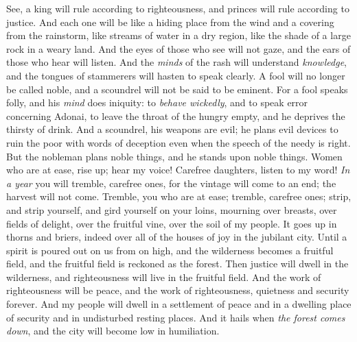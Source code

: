 \begin{biblechapter} %
 See, a king will rule according to righteousness, 
and princes will rule according to justice.
\verse And each one will be like a hiding place from the wind 
and a covering from the rainstorm, 
like streams of water in a dry region, 
like the shade of a large rock in a weary land.
\verse And the eyes of those who see will not gaze, 
and the ears of those who hear will listen.
\verse And the \textit{minds} of the rash will understand \textit{knowledge}, 
and the tongues of stammerers will hasten to speak clearly.
\verse A fool will no longer be called noble, 
and a scoundrel will not be said to be eminent.
\verse For a fool speaks folly, 
and his \textit{mind} does iniquity: 
to \textit{behave wickedly}, 
and to speak error concerning Adonai, 
to leave the throat of the hungry empty, 
and he deprives the thirsty of drink.
\verse And a scoundrel, his weapons are evil; 
he plans evil devices 
to ruin the poor with words of deception 
even when the speech of the needy is right.
\verse But the nobleman plans noble things, 
and he stands upon noble things.
 Women who are at ease, rise up; hear my voice! 
Carefree daughters, listen to my word!
\verse \textit{In a year} you will tremble, carefree ones,
\verse for the vintage will come to an end; 
the harvest will not come.
\verse Tremble, you who are at ease; 
tremble, carefree ones; 
strip, and strip yourself, 
and gird yourself on your loins,
\verse mourning over breasts, 
over fields of delight, 
over the fruitful vine,
\verse over the soil of my people. 
It goes up in thorns and briers, 
indeed over all of the houses of joy in the jubilant city.
\verse Until a spirit is poured out on us from on high,
\verse and the wilderness becomes a fruitful field, 
and the fruitful field is reckoned as the forest.
\verse Then justice will dwell in the wilderness, 
and righteousness will live in the fruitful field.
\verse And the work of righteousness will be peace, 
and the work of righteousness, quietness and security forever.
\verse And my people will dwell in a settlement of peace 
and in a dwelling place of security 
and in undisturbed resting places.
\verse And it hails when \textit{the forest comes down}, 
and the city will become low in humiliation.
\end{biblechapter}

